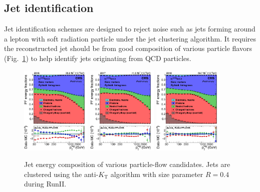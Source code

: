 \subsection{Jet identification}
Jet identification schemes are designed to reject noise such as jets forming around a lepton with soft radiation particle under the jet clustering algorithm.
It requires the reconstructed jet should be from good composition of various particle flavors (Fig.~\ref{fig:reco_jet}) to help identify jets originating from QCD particles.
\begin{figure}\centering
    \includegraphics[width=0.3\textwidth]{figure/reco_jet16.png}
    \includegraphics[width=0.3\textwidth]{figure/reco_jet17.png}
    \includegraphics[width=0.3\textwidth]{figure/reco_jet18.png}
    \caption[Jet energy composition of various particle-flow candidates.]
    {
        Jet energy composition of various particle-flow candidates.
        Jets are clustered using the anti-$K_{\mathrm{T}}$ algorithm with size parameter $R=0.4$ during RunII.
    }
    \label{fig:reco_jet}
\end{figure}

